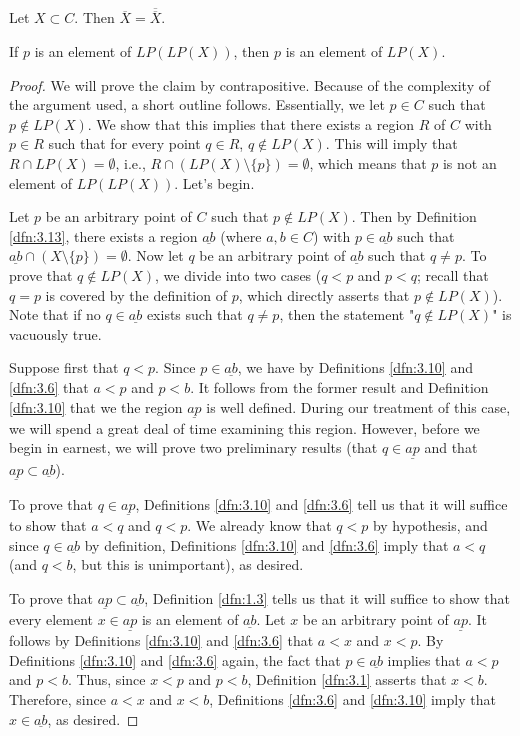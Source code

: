 \documentclass[../main.tex]{subfiles}
\begin{document}
\begin{theorem}\label{trm:4.6}
    Let $X\subset C$. Then $\overline{X}=\overline{\overline{X}}$.
    \begin{lemma*}
        If $p$ is an element of $LP(LP(X))$, then $p$ is an element of $LP(X)$.
        \begin{proof}
            We will prove the claim by contrapositive. Because of the complexity of the argument used, a short outline follows. Essentially, we let $p\in C$ such that $p\notin LP(X)$. We show that this implies that there exists a region $R$ of $C$ with $p\in R$ such that for every point $q\in R$, $q\notin LP(X)$. This will imply that $R\cap LP(X)=\emptyset$, i.e., $R\cap(LP(X)\setminus\{p\})=\emptyset$, which means that $p$ is not an element of $LP(LP(X))$. Let's begin.\par\medskip
            Let $p$ be an arbitrary point of $C$ such that $p\notin LP(X)$. Then by Definition \ref{dfn:3.13}, there exists a region $\underline{ab}$ (where $a,b\in C$) with $p\in\underline{ab}$ such that $\underline{ab}\cap(X\setminus\{p\})=\emptyset$. Now let $q$ be an arbitrary point of $\underline{ab}$ such that $q\neq p$. To prove that $q\notin LP(X)$, we divide into two cases ($q<p$ and $p<q$; recall that $q=p$ is covered by the definition of $p$, which directly asserts that $p\notin LP(X)$). Note that if no $q\in\underline{ab}$ exists such that $q\neq p$, then the statement "$q\notin LP(X)$" is vacuously true.\par\smallskip
            Suppose first that $q<p$. Since $p\in\underline{ab}$, we have by Definitions \ref{dfn:3.10} and \ref{dfn:3.6} that $a<p$ and $p<b$. It follows from the former result and Definition \ref{dfn:3.10} that we the region $\underline{ap}$ is well defined. During our treatment of this case, we will spend a great deal of time examining this region. However, before we begin in earnest, we will prove two preliminary results (that $q\in\underline{ap}$ and that $\underline{ap}\subset\underline{ab}$).\par
            To prove that $q\in\underline{ap}$, Definitions \ref{dfn:3.10} and \ref{dfn:3.6} tell us that it will suffice to show that $a<q$ and $q<p$. We already know that $q<p$ by hypothesis, and since $q\in\underline{ab}$ by definition, Definitions \ref{dfn:3.10} and \ref{dfn:3.6} imply that $a<q$ (and $q<b$, but this is unimportant), as desired.\par
            To prove that $\underline{ap}\subset\underline{ab}$, Definition \ref{dfn:1.3} tells us that it will suffice to show that every element $x\in\underline{ap}$ is an element of $\underline{ab}$. Let $x$ be an arbitrary point of $\underline{ap}$. It follows by Definitions \ref{dfn:3.10} and \ref{dfn:3.6} that $a<x$ and $x<p$. By Definitions \ref{dfn:3.10} and \ref{dfn:3.6} again, the fact that $p\in\underline{ab}$ implies that $a<p$ and $p<b$. Thus, since $x<p$ and $p<b$, Definition \ref{dfn:3.1} asserts that $x<b$. Therefore, since $a<x$ and $x<b$, Definitions \ref{dfn:3.6} and \ref{dfn:3.10} imply that $x\in\underline{ab}$, as desired.\par

\end{proof}
\end{lemma*}
\end{theorem}
\end{document}
